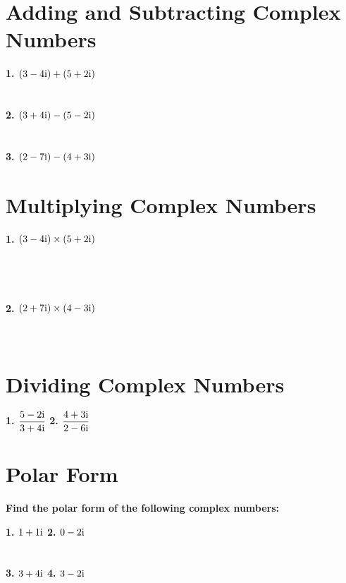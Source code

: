 
\large
\section*{Adding and Subtracting Complex Numbers}

\textbf{1. $(3 - 4\mathrm{i}) + (5 + 2\mathrm{i})$} \\\\\\
\textbf{2. $(3 + 4\mathrm{i}) - (5 - 2\mathrm{i})$} \\\\\\
\textbf{3. $(2 - 7\mathrm{i}) - (4 + 3\mathrm{i})$} \\

\section*{Multiplying Complex Numbers}

\textbf{1. $(3 - 4\mathrm{i}) \times (5 + 2\mathrm{i})$} \\\\\\\\\\
\textbf{2. $(2 + 7\mathrm{i}) \times (4 - 3\mathrm{i})$} \\\\\\

\section*{Dividing Complex Numbers}

\textbf{1. $\dfrac{5 - 2\mathrm{i}}{3 + 4\mathrm{i}}$} \phantom{XXXXXXXXXXXXXX}
\textbf{2. $\dfrac{4 + 3\mathrm{i}}{2 - 6\mathrm{i}}$}
\newpage

\section*{Polar Form}
\textbf{Find the polar form of the following complex numbers:}

\textbf{1. $1 + 1\mathrm{i}$} \phantom{XXXXXXXXXXXXXXXX}
\textbf{2. $0 - 2\mathrm{i}$} \\\\\\
\textbf{3. $3 + 4\mathrm{i}$} \phantom{XXXXXXXXXXXXXXXX}
\textbf{4. $3 - 2\mathrm{i}$} \\\\\\

